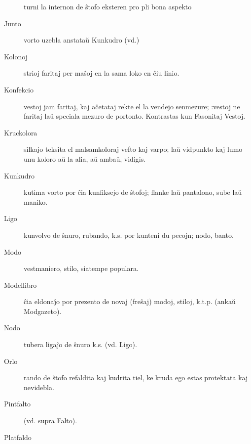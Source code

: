 \begin{description}
 turni la internon de ŝtofo eksteren pro pli bona aspekto

\item[Junto]

 vorto uzebla anstataŭ Kunkudro (vd.)

\item[Kolonoj]

 strioj faritaj per maŝoj en la sama loko en ĉiu linio.

\item[Konfekcio]

 vestoj jam faritaj, kaj aĉetataj rekte el la vendejo senmezure; :vestoj ne faritaj laŭ speciala mezuro de portonto. Kontrastas kun Fasonitaj Vestoj.

\item[Kruckolora]

 silkajo teksita el malsamkoloraj vefto kaj varpo; laŭ vidpunkto kaj lumo unu koloro aŭ la alia, aŭ ambaŭ, vidigis.

\item[Kunkudro]

 kutima vorto por ĉia kunfiksejo de ŝtofoj; flanke laŭ pantalono, sube laŭ maniko.

\item[Ligo]

 kunvolvo de ŝnuro, rubando, k.s. por kunteni du pecojn; nodo, banto.

\item[Modo]

 vestmaniero, stilo, siatempe populara.

\item[Modellibro]

ĉia eldonaĵo por prezento de novaj (freŝaj) modoj, stiloj, k.t.p. (ankaŭ Modgazeto).

\item[Nodo]

 tubera ligaĵo de ŝnuro k.s. (vd. Ligo).

\item[Orlo]

 rando de ŝtofo refaldita kaj kudrita tiel, ke kruda ego estas protektata kaj nevidebla.

\item[Pintfalto]

 (vd. supra Falto).

\item[Platfaldo]


\end{description}
